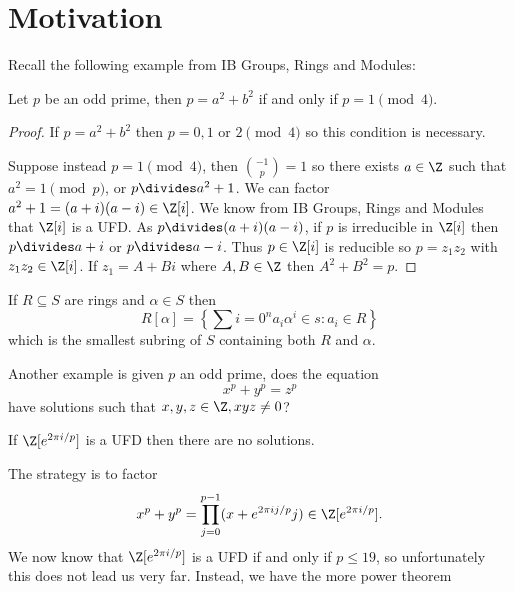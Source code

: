 \documentclass[a4paper]{article}
\begin{document}


\tableofcontents

\setcounter{section}{-1}

\section{Motivation}

Recall the following example from IB Groups, Rings and Modules:

\begin{theorem}
  Let \(p\) be an odd prime, then \(p = a^2 + b^2\) if and only if \(p = 1 \pmod 4\).
\end{theorem}

\begin{proof}
  If \(p = a^2 + b^2\) then \(p = 0, 1 \text{ or } 2 \pmod 4\) so this condition is necessary.

  Suppose instead \(p = 1 \pmod 4\), then \(\binom{-1}{p} = 1\) so there exists \(a \in \Z\) such that \(a^2 = 1 \pmod p\), or \(p \divides a^2 + 1\). We can factor \(a^2 + 1 = (a + i)(a - i) \in \Z[i]\). We know from IB Groups, Rings and Modules that \(\Z[i]\) is a UFD. As \(p \divides (a + i)(a - i)\), if \(p\) is irreducible in \(\Z[i]\)  then \(p \divides a + i\) or \(p \divides a - i\). Thus \(p \in \Z[i]\) is reducible so \(p = z_1z_2\) with \(z_1z_2 \in \Z[i]\). If \(z_1 = A + Bi\) where \(A, B \in \Z\) then \(A^2 + B^2 = p\).
\end{proof}

\begin{notation}
  If \(R \subseteq S\) are rings and \(\alpha \in S\) then
  \[
    R[\alpha] = \left\{ \sum{i = 0}^n a_i\alpha^i \in s: a_i \in R \right\}
  \]
  which is the smallest subring of \(S\) containing both \(R\) and \(\alpha\).
\end{notation}

Another example is given \(p\) an odd prime, does the equation
\[
  x^p + y^p = z^p
\]
have solutions such that \(x, y, z \in \Z, xyz \neq 0\)?

\begin{theorem}[Kummer, 1850]
  If \(\Z[e^{2\pi i/p}]\) is a UFD then there are no solutions.
\end{theorem}

The strategy is to factor
\[
  x^p + y^p = \prod_{j = 0}^{p - 1} (x + e^{2\pi ij/p}j) \in \Z[e^{2\pi i/p}].
\]
We now know that \(\Z[e^{2\pi i/p}]\) is a UFD if and only if \(p \leq 19\), so unfortunately this does not lead us very far. Instead, we have the more power theorem
\end{document}
